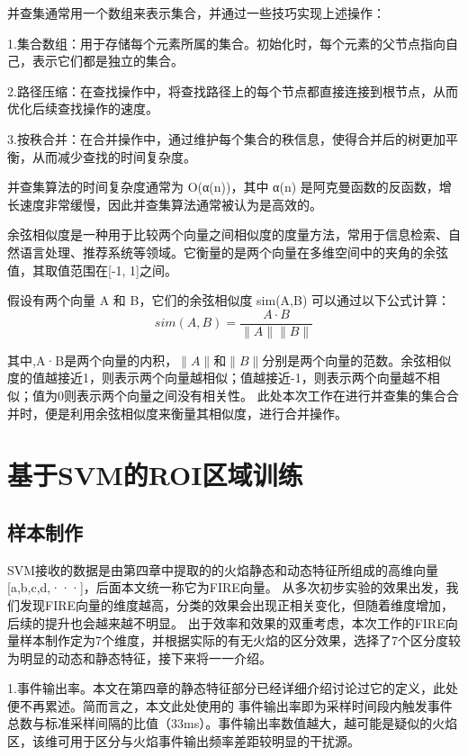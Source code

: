 并查集通常用一个数组来表示集合，并通过一些技巧实现上述操作：

1.集合数组：用于存储每个元素所属的集合。初始化时，每个元素的父节点指向自己，表示它们都是独立的集合。

2.路径压缩：在查找操作中，将查找路径上的每个节点都直接连接到根节点，从而优化后续查找操作的速度。

3.按秩合并：在合并操作中，通过维护每个集合的秩信息，使得合并后的树更加平衡，从而减少查找的时间复杂度。

并查集算法的时间复杂度通常为 O(α(n))，其中 α(n) 是阿克曼函数的反函数，增长速度非常缓慢，因此并查集算法通常被认为是高效的。

余弦相似度是一种用于比较两个向量之间相似度的度量方法，常用于信息检索、自然语言处理、推荐系统等领域。它衡量的是两个向量在多维空间中的夹角的余弦值，其取值范围在[-1, 1]之间。

假设有两个向量 A 和 B，它们的余弦相似度 sim(A,B) 可以通过以下公式计算：
\begin{equation} 
    sim(A,B)=\frac{A·B}{\lVert A \rVert \lVert B \rVert}
\end{equation}

其中,A·B是两个向量的内积，$\lVert A \rVert$和$\lVert B \rVert$分别是两个向量的范数。余弦相似度的值越接近1，则表示两个向量越相似；值越接近-1，则表示两个向量越不相似；值为0则表示两个向量之间没有相关性。
此处本次工作在进行并查集的集合合并时，便是利用余弦相似度来衡量其相似度，进行合并操作。


\section{基于SVM的ROI区域训练}
\subsection{样本制作}
SVM接收的数据是由第四章中提取的的火焰静态和动态特征所组成的高维向量[a,b,c,d,···]，后面本文统一称它为FIRE向量。
从多次初步实验的效果出发，我们发现FIRE向量的维度越高，分类的效果会出现正相关变化，但随着维度增加，后续的提升也会越来越不明显。
出于效率和效果的双重考虑，本次工作的FIRE向量样本制作定为7个维度，并根据实际的有无火焰的区分效果，选择了7个区分度较为明显的动态和静态特征，接下来将一一介绍。

1.事件输出率。本文在第四章的静态特征部分已经详细介绍讨论过它的定义，此处便不再累述。简而言之，本文此处使用的
事件输出率即为采样时间段内触发事件总数与标准采样间隔的比值（33ms）。事件输出率数值越大，越可能是疑似的火焰区，该维可用于区分与火焰事件输出频率差距较明显的干扰源。

